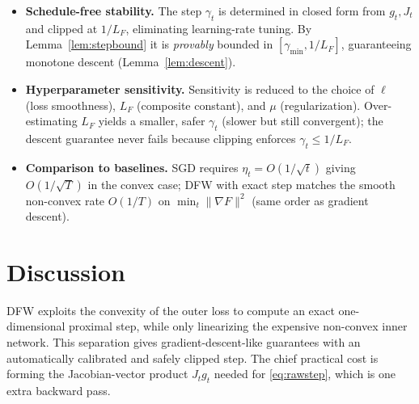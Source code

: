 \documentclass[11pt]{article}
\begin{document}
\begin{itemize}
  \item \textbf{Schedule-free stability.} The step $\gamma_t$ is determined in
        closed form from $g_t,J_t$ and clipped at $1/L_F$, eliminating
        learning-rate tuning. By Lemma~\ref{lem:stepbound} it is
        \emph{provably} bounded in $[\gamma_{\min}, 1/L_F]$, guaranteeing
        monotone descent (Lemma~\ref{lem:descent}).
  \item \textbf{Hyperparameter sensitivity.} Sensitivity is reduced to the
        choice of $\ell$ (loss smoothness), $L_F$ (composite constant), and
        $\mu$ (regularization). Over-estimating $L_F$ yields a smaller, safer
        $\gamma_t$ (slower but still convergent); the descent guarantee never
        fails because clipping enforces $\gamma_t\le 1/L_F$.
  \item \textbf{Comparison to baselines.} SGD requires
        $\eta_t = O(1/\sqrt t)$ giving $O(1/\sqrt T)$ in the convex case;
        DFW with exact step matches the smooth non-convex rate $O(1/T)$ on
        $\min_t\|\nabla F\|^2$ (same order as gradient descent).
\end{itemize}

\section*{Discussion}
DFW exploits the convexity of the outer loss to compute an exact one-dimensional
proximal step, while only linearizing the expensive non-convex inner network.
This separation gives gradient-descent-like guarantees with an automatically
calibrated and safely clipped step. The chief practical cost is forming the
Jacobian-vector product $J_t g_t$ needed for \eqref{eq:rawstep}, which is one
extra backward pass.

\end{document}
